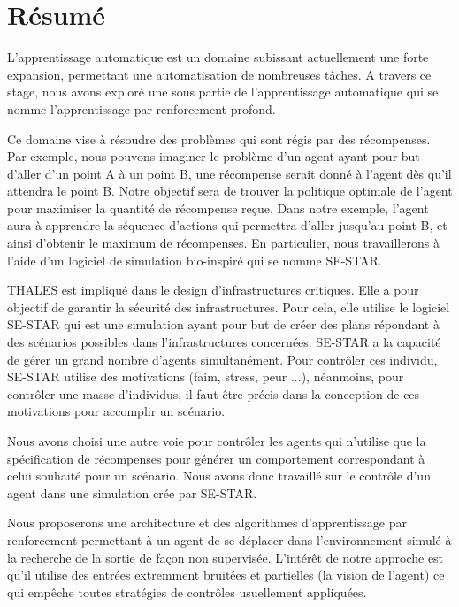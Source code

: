 \newpage


\section*{Résumé}
\bigskip

L'apprentissage automatique est un domaine subissant actuellement une forte expansion, permettant une automatisation de nombreuses tâches. A travers ce stage, nous avons exploré une sous partie de l'apprentissage automatique qui se nomme l'apprentissage par renforcement profond. 

Ce domaine vise à résoudre des problèmes qui sont régis par des récompenses. Par exemple, nous pouvons imaginer le problème d'un agent ayant pour but d'aller d'un point A à un point B, une récompense serait donné à l'agent dès qu'il attendra le point B. Notre objectif sera de trouver la politique optimale de l'agent pour maximiser la quantité de récompense reçue. Dans notre exemple, l'agent aura à apprendre la séquence d'actions qui permettra d'aller jusqu'au point B, et ainsi d'obtenir le maximum de récompenses. En particulier, nous travaillerons à l'aide d'un logiciel de simulation bio-inspiré qui se nomme SE-STAR. 

THALES est impliqué dans le design d'infrastructures critiques. Elle a pour objectif de garantir la sécurité des infrastructures. Pour cela, elle utilise le logiciel SE-STAR qui est une simulation ayant pour but de créer des plans répondant à des scénarios possibles dans l'infrastructures concernées. SE-STAR a la capacité de gérer un grand nombre d'agents simultanément. Pour contrôler ces individu, SE-STAR utilise des motivations (faim, stress, peur ...), néanmoins, pour contrôler une masse d'individus, il faut être précis dans la conception de ces motivations pour accomplir un scénario.

Nous avons choisi une autre voie pour contrôler les agents qui n'utilise que la spécification de récompenses pour générer un comportement correspondant à celui souhaité pour un scénario.
Nous avons donc travaillé sur le contrôle d'un agent dans une simulation crée par SE-STAR.

Nous proposerons une architecture et des algorithmes d'apprentissage par renforcement permettant à un agent de se déplacer dans l'environnement simulé à la recherche de la sortie de façon non supervisée. L'intérêt de notre approche est qu'il utilise des entrées extremment bruitées et partielles (la vision de l'agent) ce qui empêche toutes stratégies de contrôles usuellement appliquées.

